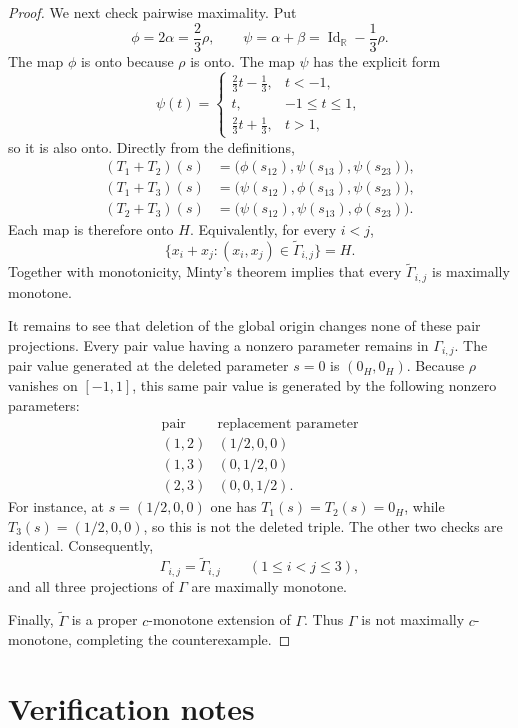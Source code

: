 \documentclass[11pt]{article}
\newcommand{\R}{\mathbb{R}}
\newcommand{\Id}{\operatorname{Id}}
\begin{document}
\begin{proof}
We next check pairwise maximality.  Put
\[
 \phi=2\alpha=\frac23\rho,
 \qquad
 \psi=\alpha+\beta=\Id_{\R}-\frac13\rho.
\]
The map \(\phi\) is onto because \(\rho\) is onto.  The map \(\psi\) has the
explicit form
\[
 \psi(t)=\begin{cases}
 \frac23t-\frac13,&t<-1,\\
 t,&-1\le t\le1,\\
 \frac23t+\frac13,&t>1,
 \end{cases}
\]
so it is also onto.  Directly from the definitions,
\begin{align*}
(T_1+T_2)(s)&=\bigl(\phi(s_{12}),\psi(s_{13}),\psi(s_{23})\bigr),\\
(T_1+T_3)(s)&=\bigl(\psi(s_{12}),\phi(s_{13}),\psi(s_{23})\bigr),\\
(T_2+T_3)(s)&=\bigl(\psi(s_{12}),\psi(s_{13}),\phi(s_{23})\bigr).
\end{align*}
Each map is therefore onto \(H\).  Equivalently, for every \(i<j\),
\[
 \{x_i+x_j:(x_i,x_j)\in\widetilde\Gamma_{i,j}\}=H.
\]
Together with monotonicity, Minty's theorem implies that every
\(\widetilde\Gamma_{i,j}\) is maximally monotone.

It remains to see that deletion of the global origin changes none of these
pair projections.  Every pair value having a nonzero parameter remains in
\(\Gamma_{i,j}\).  The pair value generated at the deleted parameter \(s=0\)
is \((0_H,0_H)\).  Because \(\rho\) vanishes on \([-1,1]\), this same pair
value is generated by the following nonzero parameters:
\[
\begin{array}{c|c}
\text{pair}&\text{replacement parameter}\\ \hline
(1,2)&(1/2,0,0)\\
(1,3)&(0,1/2,0)\\
(2,3)&(0,0,1/2).
\end{array}
\]
For instance, at \(s=(1/2,0,0)\) one has \(T_1(s)=T_2(s)=0_H\), while
\(T_3(s)=(1/2,0,0)\), so this is not the deleted triple.  The other two
checks are identical.  Consequently,
\[
 \Gamma_{i,j}=\widetilde\Gamma_{i,j}
 \qquad(1\le i<j\le3),
\]
and all three projections of \(\Gamma\) are maximally monotone.

Finally, \(\widetilde\Gamma\) is a proper \(c\)-monotone extension of
\(\Gamma\).  Thus \(\Gamma\) is not maximally \(c\)-monotone, completing the
counterexample.
\end{proof}

\section{Verification notes}
\end{document}
